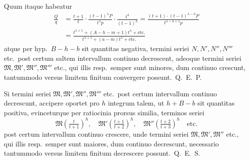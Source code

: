 \documentclass[12pt,a4paper]{article}
\begin{document}
Quum itaque habeatur
\begin{align*}
\frac{Q}{q} &= \frac{t+1}{t}\cdot\frac{(t-1)^{\lambda}P}{t^{\lambda}p}\cdot\frac{t^h}{(t-1)^h} = \frac{(t+1)\cdot(t-1)^{\lambda-h}P}{t^{\lambda-h+1}p}\\
&= \frac{t^{\lambda+1} + (A-h-m+1)t^{\lambda} + \text{etc.}}{t^{\lambda+1} + (a-m)t^{\lambda} + \text{etc.}}
\end{align*}
atque per hyp.\ $B-h-b$ sit quantitas negativa, termini seriei $N, N', N'', N'''$ etc.\ post certum saltem intervallum continuo decrescent, adeoque termini seriei $\mathfrak{M}, \mathfrak{M}', \mathfrak{M}'', \mathfrak{M}'''$ etc., qui illis resp.\ semper sunt minores, dum continuo crescunt, tantummodo versus limitem finitum convergere possunt.\ Q.\ E.\ P.

Si termini seriei $\mathfrak{M}, \mathfrak{M}', \mathfrak{M}'', \mathfrak{M}'''$ etc.\ post certum intervallum continuo decrescunt, accipere oportet pro $h$ integrum talem, ut $h+B-b$ sit quantitas positiva, evinceturque per ratiocinia prorsus similia, terminos seriei
\[
\mathfrak{M}(\tfrac{t}{t+1})^{\!h},\quad \mathfrak{M}'(\tfrac{t+1}{t+2})^{\!h},\quad \mathfrak{M}''(\tfrac{t+2}{t+3})^{\!h} \quad \text{etc.}
\]
post certum intervallum continuo crescere, unde termini seriei $\mathfrak{M}, \mathfrak{M}', \mathfrak{M}''$ etc., qui illis resp.\ semper sunt maiores, dum continuo decrescunt, necessario tantummodo versus limitem finitum decrescere possunt.\ Q.\ E.\ S.
\end{document}
